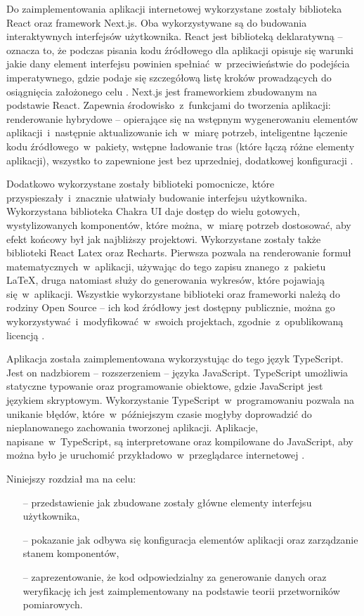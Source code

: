 Do zaimplementowania aplikacji internetowej wykorzystane zostały biblioteka React oraz framework
Next.js. Oba wykorzystywane są do budowania interaktywnych interfejsów użytkownika. React jest
biblioteką deklaratywną -- oznacza to, że podczas pisania kodu źródłowego dla aplikacji opisuje się
warunki jakie dany element interfejsu powinien spełniać~w~przeciwieństwie do podejścia
imperatywnego, gdzie podaje się szczegółową listę kroków prowadzących do osiągnięcia założonego celu
\cite{react-main}. Next.js jest frameworkiem zbudowanym na podstawie React.
Zapewnia środowisko~z~funkcjami do tworzenia aplikacji: renderowanie hybrydowe -- opierające się na
wstępnym wygenerowaniu elementów aplikacji~i~następnie aktualizowanie ich~w~miarę potrzeb,
inteligentne łączenie kodu źródłowego~w~pakiety, wstępne ładowanie tras (które łączą różne elementy
aplikacji), wszystko to zapewnione jest bez uprzedniej, dodatkowej konfiguracji \cite{nextjs-main}.

Dodatkowo wykorzystane zostały biblioteki pomocnicze, które przyspieszały~i~znacznie
ułatwiały budowanie interfejsu użytkownika. Wykorzystana biblioteka Chakra UI daje dostęp do wielu
gotowych, wystylizowanych komponentów, które można,~w~miarę potrzeb dostosować, aby efekt końcowy
był jak najbliższy projektowi. Wykorzystane zostały także biblioteki React Latex oraz Recharts.
Pierwsza pozwala na renderowanie formuł matematycznych~w~aplikacji, używając do tego zapisu
znanego~z~pakietu LaTeX, druga natomiast służy do generowania wykresów, które pojawiają
się~w~aplikacji. Wszystkie wykorzystane biblioteki oraz frameworki należą do rodziny Open Source --
ich kod źródłowy jest dostępny publicznie, można go wykorzystywać~i~modyfikować~w~swoich
projektach, zgodnie~z~opublikowaną licencją \cite{snyk-licences, snyk-mit}.

Aplikacja została zaimplementowana wykorzystując do tego język TypeScript. Jest on nadzbiorem --
rozszerzeniem -- języka JavaScript. TypeScript umożliwia statyczne typowanie oraz programowanie
obiektowe, gdzie JavaScript jest językiem skryptowym. Wykorzystanie TypeScript~w~programowaniu
pozwala na unikanie błędów, które~w~późniejszym czasie mogłyby doprowadzić do nieplanowanego
zachowania tworzonej aplikacji. Aplikacje, napisane~w~TypeScript, są interpretowane oraz
kompilowane do JavaScript, aby można było je uruchomić przykładowo~w~przeglądarce
internetowej \cite{ts-main}.

Niniejszy rozdział ma na celu:
\begin{itemize}
  \item[--] przedstawienie jak zbudowane zostały główne elementy interfejsu użytkownika,
  \item[--] pokazanie jak odbywa się konfiguracja elementów aplikacji oraz zarządzanie stanem
        komponentów,
  \item[--] zaprezentowanie, że kod odpowiedzialny za generowanie danych oraz weryfikację ich
        jest zaimplementowany na podstawie teorii przetworników pomiarowych.
\end{itemize}

